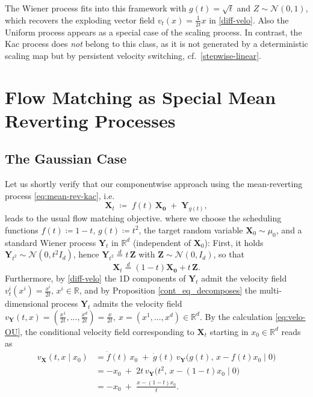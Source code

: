 \documentclass{article}
\newcommand{\R}{\mathbb{R}}
\theoremstyle{plain}
\theoremstyle{definition}
\theoremstyle{remark}
\begin{document}
{The Wiener process fits into this framework with $g(t)=\sqrt{t}$ and $Z\sim\mathcal N(0,1)$, which recovers the exploding vector field $v_t(x)=\tfrac{1}{2t}x$ in \eqref{diff-velo}. Also the Uniform process
appears as a special case of the scaling process.
In contrast, the Kac process does \emph{not} belong to this class, as it is not generated by a deterministic scaling map but by persistent velocity switching, cf.\ \eqref{stepwise-linear}.}

\section{Flow Matching as Special Mean Reverting Processes}\label{sec:connection-FM}
\subsection{The Gaussian Case}
Let us shortly verify that our componentwise approach using the mean-reverting process \eqref{eq:mean-rev-kac}, 
i.e.\
\begin{equation}
    \mathbf{X}_t \;\coloneqq\; f(t)\,\mathbf{X_0} \;+\; \mathbf{Y}_{g(t)},
\end{equation}
leads to the usual flow matching objective. where we choose
the scheduling functions $f(t) \coloneqq 1-t, \, g(t) \coloneqq t^2$, the target random variable $\mathbf{X}_0 \sim \mu_0$, and a standard Wiener process $\mathbf{Y}_t$ in $\R^d$ (independent of $\mathbf{X}_0$): 
First, it holds $\mathbf{Y}_{t^2} \sim \mathcal{N}(0, t^2 I_d)$, hence $\mathbf{Y}_{t^2} \overset{d}{=} t \, \mathbf{Z}$ with $\mathbf{Z} \sim \mathcal{N}(0, I_d)$, so that
\begin{equation}
   \mathbf{X}_t \overset{d}{=} (1-t)\mathbf{X_0} + t \, \mathbf{Z}. 
\end{equation}
Furthermore, by \eqref{diff-velo} the 1D components of $\mathbf{Y}_t$ admit the velocity field $v_t^i(x^i) = \frac{x^i}{2t}, \, x^i \in \R$, and by Proposition \ref{cont_eq_decomposes} the multi-dimensional process $\mathbf{Y}_t$ admits the velocity field $v_{\mathbf{Y}}(t,x) = (\frac{x^1}{2t}, ..., \frac{x^d}{2t}) = \frac{x}{2t}, ~ x=(x^1,...,x^d) \in \R^d$.
By the calculation \eqref{eq:velo-OU}, the conditional velocity field corresponding to $\mathbf{X}_t$ starting in $x_0 \in \R^d$ reads as
\begin{align}
  v_{\mathbf{X}}(t,x\mid x_0)
  &= \dot f(t)\,x_0 \;+\; \dot g(t)\,v_{\mathbf{Y}}\bigl(g(t),\,x - f(t)x_0\mid0 \bigr)\\
  &= -x_0 \;+\; 2t\,v_{\mathbf{Y}}\bigl(t^2,\,x - (1-t)x_0\mid 0 \bigr)\\
  &= -x_0 \;+\; \frac{x - (1-t)x_0}{t}.
\end{align}
\end{document}

